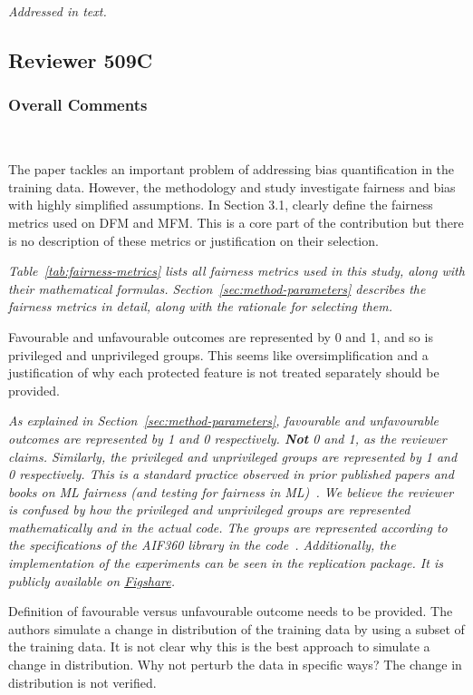 \documentclass[conference,review,anonymous]{IEEEtran}
\newcommand{\highlight}[1]{\begin{framed}%
  \noindent\emph{#1}
\end{framed}}
\begin{document}
\highlight{Addressed in text.}

\subsection{Reviewer 509C}

\subsubsection{Overall Comments}~\label{sec:509c-overall}

The paper tackles an important problem of addressing bias
quantification in the training data. However, the methodology and
study investigate fairness and bias with highly simplified
assumptions. In Section 3.1, clearly define the fairness metrics used
on DFM and MFM. This is a core part of the contribution but there is
no description of these metrics or justification on their
selection.

\highlight{Table~\ref{tab:fairness-metrics} lists all fairness metrics
used in this study, along with their mathematical
formulas. Section~\ref{sec:method-parameters} describes the fairness
metrics in detail, along with the rationale for selecting them.}

Favourable and unfavourable outcomes are represented by
0 and 1, and so is privileged and unprivileged groups. This seems like
oversimplification and a justification of why each protected feature
is not treated separately should be provided.

\highlight{As explained in Section~\ref{sec:method-parameters},
favourable and unfavourable outcomes are represented by 1 and
0 respectively. \textbf{Not} 0 and 1, as the reviewer
claims. Similarly, the privileged and unprivileged groups are
represented by 1 and 0 respectively. This is a standard practice
observed in prior published papers and books on ML fairness (and
testing for fairness in
ML)~\cite{barocas2019fairness,zhang2021ignorance,biswas2021fair}. We
believe the reviewer is confused by how the privileged and
unprivileged groups are represented mathematically and in the actual
code. The groups are represented according to the specifications of
the \emph{AIF360} library in the
code~\cite{bellamy2019ai}. Additionally, the implementation of the
experiments can be seen in the replication package. It is publicly
available on
\href{https://figshare.com/s/67206f7c219b12885a6f}{Figshare}.}

Definition of favourable versus unfavourable outcome needs to be
provided. The authors simulate a change in distribution of the
training data by using a subset of the training data. It is not clear
why this is the best approach to simulate a change in
distribution. Why not perturb the data in specific ways? The change in
distribution is not verified.
\end{document}
